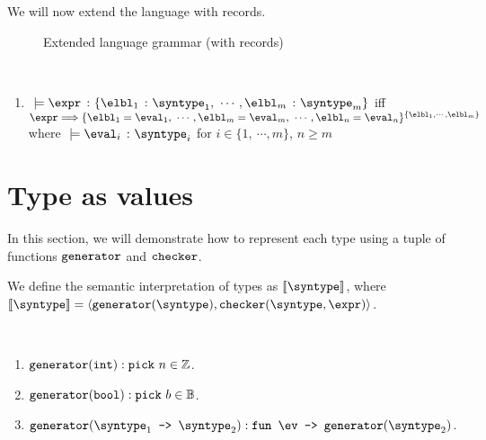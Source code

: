 We will now extend the language with records.

\begin{figure}[hbt!]%
  \begin{grammar}
            \grule[values]{\eval}{
              \cdots
              \gor \{\overline{\elbl = \eval}\}^{\{\overline{\elbl}\}}
            }
            \grule[types]{\syntype}{
              \cdots
              \gor \{\overline{\hastype{\elbl}{\syntype}}\} 
          }
        \end{grammar}
    \caption{Extended language grammar (with records)}
    \label{rec_Grammar}
\end{figure}

\begin{definition}
  \label{def_typingRec}
  \ \par
  \begin{enumerate}
      \item $\ \models \hastype{\expr}{\{\hastype{\elbl_1}{\syntype_1},\ \cdots, \hastype{\elbl_m}{\syntype_m}\}}$ iff $\expr \bigstep \{\elbl_1 = \eval_1,\ \cdots, \elbl_m = \eval_m,\ \cdots, \elbl_n = \eval_n\}^{\{\elbl_1, \cdots, \elbl_m\}}$ where $\ \models \hastype{\eval_i}{\syntype_i}$ for $i \in \{1,\ \cdots, m\}$, $n \geq m$
  \end{enumerate}
\end{definition}

\section{Type as values}

In this section, we will demonstrate how to represent each type using a tuple of functions $\texttt{generator}$ and $\texttt{checker}$.

\begin{definition}
  \label{def_typeAsVal}
  We define the semantic interpretation of types as $\llbracket \syntype \rrbracket$, where $\llbracket \syntype \rrbracket = \langle \mkgen{\syntype}, \mkche{\syntype}{\expr} \rangle$.
\end{definition}

\begin{definition}
  \label{def_genCore}
  \ \par 
  \begin{enumerate}
    \item $\texttt{generator}(\texttt{int}) : \texttt{pick} \ n \in \mathbb{Z}$.
    \item $\texttt{generator}(\texttt{bool}) : \texttt{pick} \ b \in \mathbb{B}$.
    \item $\mkgen{\mkfun{\syntype_1}{\syntype_2}} : \mkfunv{\ev}{\mkgen{\syntype_2}}$.
  \end{enumerate}
\end{definition}


